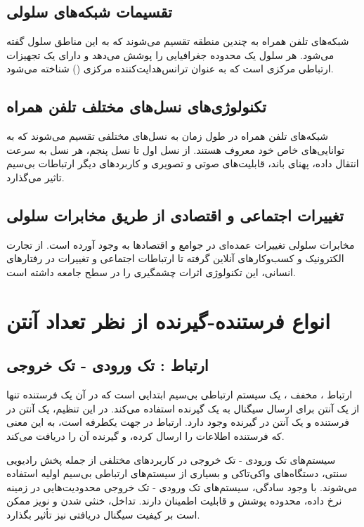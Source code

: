 \subsection{تقسیمات شبکه‌های سلولی}
شبکه‌های تلفن همراه به چندین منطقه تقسیم می‌شوند که به این مناطق سلول‌ گفته می‌شود. هر سلول یک محدوده جغرافیایی را پوشش می‌دهد و دارای یک تجهیزات ارتباطی مرکزی است که به عنوان ترانس‌هدایت‌کننده مرکزی () شناخته می‌شود.

\subsection{تکنولوژی‌های نسل‌های مختلف تلفن همراه}
شبکه‌های تلفن همراه در طول زمان به نسل‌های مختلفی تقسیم می‌شوند که به توانایی‌های خاص خود معروف هستند. از نسل اول تا نسل پنجم، هر نسل به سرعت انتقال داده، پهنای باند، قابلیت‌های صوتی و تصویری و کاربردهای دیگر ارتباطات بی‌سیم تاثیر می‌گذارد.

\subsection{تغییرات اجتماعی و اقتصادی از طریق مخابرات سلولی}
مخابرات سلولی تغییرات عمده‌ای در جوامع و اقتصادها به وجود آورده است. از تجارت الکترونیک و کسب‌وکارهای آنلاین گرفته تا ارتباطات اجتماعی و تغییرات در رفتارهای انسانی، این تکنولوژی اثرات چشمگیری را در سطح جامعه داشته است.
\section{انواع فرستنده-گیرنده از نظر تعداد آنتن}

\subsection{
	ارتباط  : تک ورودی - تک خروجی
}

ارتباط ، مخفف ، یک سیستم ارتباطی بی‌سیم ابتدایی است که در آن یک فرستنده تنها از یک آنتن برای ارسال سیگنال به یک گیرنده استفاده می‌کند. در این تنظیم، یک آنتن در فرستنده و یک آنتن در گیرنده وجود دارد. ارتباط در جهت یکطرفه است، به این معنی که فرستنده اطلاعات را ارسال کرده، و گیرنده آن را دریافت می‌کند.

سیستم‌های تک ورودی - تک خروجی در کاربردهای مختلفی از جمله پخش رادیویی سنتی، دستگاه‌های واکی‌تاکی و بسیاری از سیستم‌های ارتباطی بی‌سیم اولیه استفاده می‌شوند. با وجود سادگی، سیستم‌های تک ورودی - تک خروجی محدودیت‌هایی در زمینه نرخ داده، محدوده پوشش و قابلیت اطمینان دارند. تداخل، خنثی شدن و نویز ممکن است بر کیفیت سیگنال دریافتی نیز تأثیر بگذارد.

